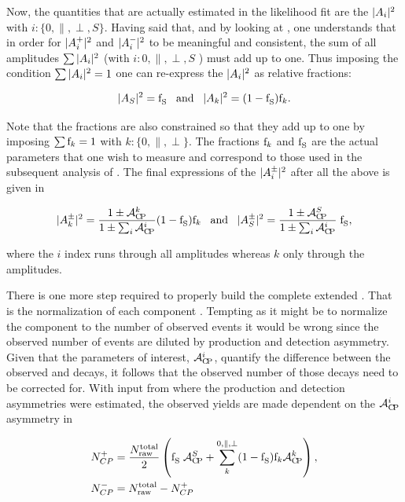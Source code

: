 \noindent Now, the quantities that are actually estimated in the likelihood fit are the $|{A}_{i}|^2$ with $i:\{0,\parallel,\perp,S\}$.
Having said that, and by looking at , one understands that in order for $|{A}_{i}^+|^2$ and $|{A}_{i}^-|^2$
to be meaningful and consistent, the sum of all amplitudes $\sum|{A}_{i}|^2$ (with $i:{0,\parallel,\perp,S}$ ) must add up to one.
Thus imposing the condition $\sum|{A}_{i}|^2 = 1$ one can re-express the $|{A}_{i}|^2$ as relative fractions:

\begin{equation}
|{A}_{S}|^2 = \text{f}_{\text{S}}^{} \;\;\;\text{and}\;\;\; |{A}_{k}|^2 = (1-\text{f}_{\text{S}}^{})\text{f}_{k}.
\label{amps_param}
\end{equation}

\noindent Note that the \pwave fractions are also constrained so that they add up to one by imposing $\sum\text{f}_{k}=1$ with $k:\{0,\parallel,\perp\}$.
The fractions $\text{f}_{k}$ and $\text{f}_{\text{S}}^{}$ are the actual parameters that one wish to measure and correspond to those used in the subsequent analysis of
. The final expressions of the $|{A}_{i}^{\pm}|^2$ after all the above is given in 

\begin{equation}
|{A}_{k}^{\pm}|^2 = \frac{1\pm\mathcal{A}_{\rm C\!P}^{k}}{1\pm\sum_i\mathcal{A}_{\rm C\!P}^{i}}  (1-\text{f}_{\text{S}}^{})\text{f}_{k}  \;\;\; \text{and}\;\;\; |{A}_{S}^{\pm}|^2 = \frac{1\pm\mathcal{A}_{\rm C\!P}^{S}}{1\pm\sum_i\mathcal{A}_{\rm C\!P}^{i}} \; \text{f}_{\text{S}}^{},
\label{amps_final}
\end{equation}

\noindent where the $i$ index runs through all amplitudes whereas $k$ only through the \pwave amplitudes.

There is one more step required to properly build the complete extended \pdf. That is the normalization of each component \pdf. Tempting as it might be to
normalize the component \pdfs to the number of observed events it would be wrong since the observed number of events are diluted by production and detection
asymmetry. Given that the parameters of interest, $\mathcal{A}_{\rm C\!P}^{i}$, quantify the difference between the observed \BsbarJpsiKst and \BsJpsiKst decays, it follows that
the observed  number of those decays need to be corrected for. With input from  where the production and detection
asymmetries were estimated, the observed yields are made dependent on the $\mathcal{A}_{\rm C\!P}^{i}$ asymmetry in 

\begin{subequations}
  \label{acp_yields}
  \begin{align}
    N^{+}_{CP} &= \frac{ N_{\text{raw}}^{\text{total}} }{2} \left( \text{f}_{\text{S}}^{}\; \mathcal{A}_{\rm C\!P}^{S} + \sum_k^{0,\parallel,\perp} (1-\text{f}_{\text{S}}^{})\text{f}_{k}\mathcal{A}_{\rm C\!P}^{k}  \right), \\
    N^{-}_{CP} &=  N_{\text{raw}}^{\text{total}} - N^{+}_{CP}
  \end{align}
\end{subequations}

